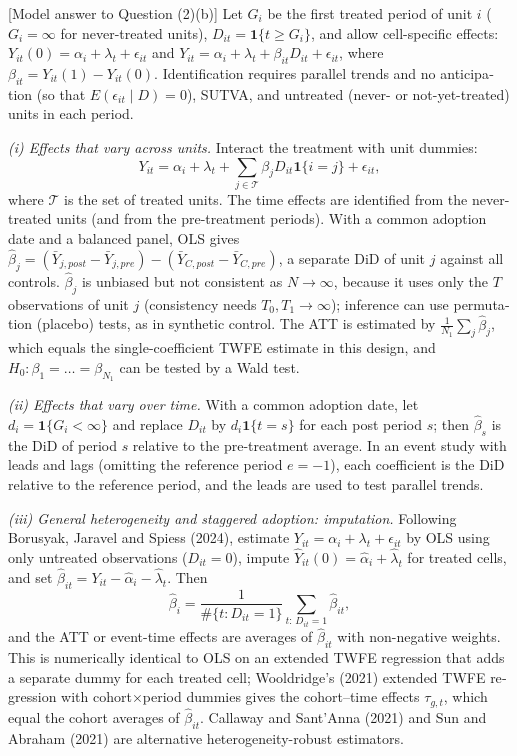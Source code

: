 \begin{english}[Model answer to Question (2)(b)]
Let $G_i$ be the first treated period of unit $i$ ($G_i=\infty$ for never-treated units), $D_{it}=\mathbf{1}\{t\ge G_i\}$, and allow cell-specific effects: $Y_{it}(0)=\alpha_i+\lambda_t+\epsilon_{it}$ and $Y_{it}=\alpha_i+\lambda_t+\beta_{it}D_{it}+\epsilon_{it}$, where $\beta_{it}=Y_{it}(1)-Y_{it}(0)$. Identification requires parallel trends and no anticipation (so that $E(\epsilon_{it}\mid D)=0$), SUTVA, and untreated (never- or not-yet-treated) units in each period.

\textit{(i) Effects that vary across units.} Interact the treatment with unit dummies:
\[
Y_{it}=\alpha_i+\lambda_t+\sum_{j\in\mathcal T}\beta_jD_{it}\mathbf{1}\{i=j\}+\epsilon_{it},
\]
where $\mathcal T$ is the set of treated units. The time effects are identified from the never-treated units (and from the pre-treatment periods). With a common adoption date and a balanced panel, OLS gives $\hat\beta_j=(\bar Y_{j,post}-\bar Y_{j,pre})-(\bar Y_{C,post}-\bar Y_{C,pre})$, a separate DiD of unit $j$ against all controls. $\hat\beta_j$ is unbiased but not consistent as $N\to\infty$, because it uses only the $T$ observations of unit $j$ (consistency needs $T_0,T_1\to\infty$); inference can use permutation (placebo) tests, as in synthetic control. The ATT is estimated by $\frac1{N_1}\sum_j\hat\beta_j$, which equals the single-coefficient TWFE estimate in this design, and $H_0:\beta_1=\dots=\beta_{N_1}$ can be tested by a Wald test.

\textit{(ii) Effects that vary over time.} With a common adoption date, let $d_i=\mathbf{1}\{G_i<\infty\}$ and replace $D_{it}$ by $d_i\mathbf{1}\{t=s\}$ for each post period $s$; then $\hat\beta_s$ is the DiD of period $s$ relative to the pre-treatment average. In an event study with leads and lags (omitting the reference period $e=-1$), each coefficient is the DiD relative to the reference period, and the leads are used to test parallel trends.

\textit{(iii) General heterogeneity and staggered adoption: imputation.} Following Borusyak, Jaravel and Spiess (2024), estimate $Y_{it}=\alpha_i+\lambda_t+\epsilon_{it}$ by OLS using only untreated observations ($D_{it}=0$), impute $\hat Y_{it}(0)=\hat\alpha_i+\hat\lambda_t$ for treated cells, and set $\hat\beta_{it}=Y_{it}-\hat\alpha_i-\hat\lambda_t$. Then
\[
\hat\beta_i=\frac{1}{\#\{t:D_{it}=1\}}\sum_{t:\,D_{it}=1}\hat\beta_{it},
\]
and the ATT or event-time effects are averages of $\hat\beta_{it}$ with non-negative weights. This is numerically identical to OLS on an extended TWFE regression that adds a separate dummy for each treated cell; Wooldridge's (2021) extended TWFE regression with cohort$\times$period dummies gives the cohort--time effects $\tau_{g,t}$, which equal the cohort averages of $\hat\beta_{it}$. Callaway and Sant'Anna (2021) and Sun and Abraham (2021) are alternative heterogeneity-robust estimators.


\end{english}
